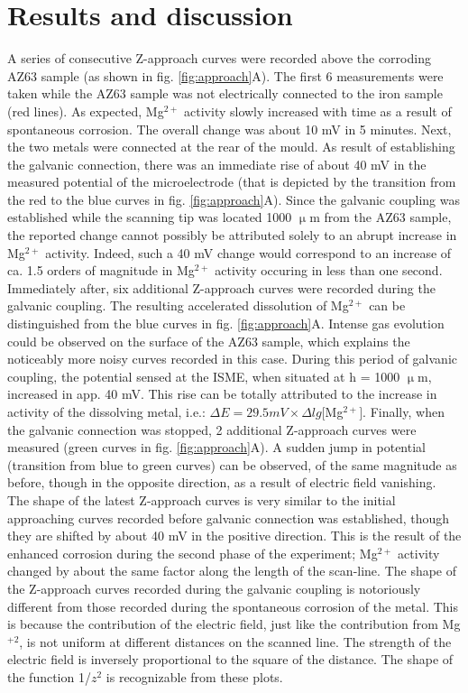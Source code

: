 \documentclass[3p]{elsarticle}
\begin{document}
\section{Results and discussion}

A series of consecutive Z-approach curves were recorded above the corroding AZ63 sample (as shown in fig. \ref{fig:approach}A). The first 6 measurements were taken while the AZ63 sample was not electrically connected to the iron sample (red lines). As expected, Mg$^{2+}$ activity slowly increased with time as a result of spontaneous corrosion. The overall change was about 10 mV in 5 minutes. Next, the two metals were connected at the rear of the mould. As result of establishing the galvanic connection, there was an immediate rise of about 40 mV in the measured potential of the microelectrode (that is depicted by the transition from the red to the blue curves in fig. \ref{fig:approach}A). Since the galvanic coupling was established while the scanning tip was located 1000 $\upmu$m from the AZ63 sample, the reported change cannot possibly be attributed solely to an abrupt increase in Mg$^{2+}$ activity. Indeed, such a 40 mV change would correspond to an increase of ca. 1.5 orders of magnitude in Mg$^{2+}$ activity occuring in less than one second. Immediately after, six additional Z-approach curves were recorded during the galvanic coupling. The resulting accelerated dissolution of Mg$^{2+}$ can be distinguished from the blue curves in fig. \ref{fig:approach}A. Intense gas evolution could be observed on the surface of the AZ63 sample, which explains the noticeably more noisy curves recorded in this case. During this period of galvanic coupling, the potential sensed at the ISME, when situated at h = 1000 $\upmu$m, increased in app. 40 mV. This rise can be totally attributed to the increase in activity of the dissolving metal, i.e.: $\Delta E = 29.5 mV \times \Delta lg[$Mg$^{2+}]$. Finally, when the galvanic connection was stopped, 2 additional Z-approach curves were measured (green curves in fig. \ref{fig:approach}A). A sudden jump in potential (transition from blue to green curves) can be observed, of the same magnitude as before, though in the opposite direction, as a result of electric field vanishing. The shape of the latest Z-approach curves is very similar to the initial approaching curves recorded before galvanic connection was established, though they are shifted by about 40 mV in the positive direction. This is the result of the enhanced corrosion during the second phase of the experiment; Mg$^{2+}$ activity changed by about the same factor along the length of the scan-line. The shape of the Z-approach curves recorded during the galvanic coupling is notoriously different from those recorded during the spontaneous corrosion of the metal. This is because the contribution of the electric field, just like the contribution from Mg$^{+2}$, is not uniform at different distances on the scanned line. The strength of the electric field is inversely proportional to the square of the distance. The shape of the function 1/$z^2$ is recognizable from these plots.
\end{document}
